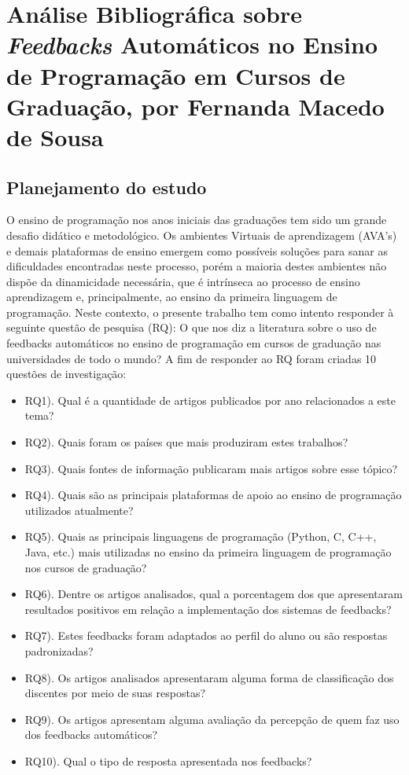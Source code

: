 \chapter{Análise Bibliográfica sobre \textit{Feedbacks} Automáticos no Ensino de Programação em Cursos de Graduação, por Fernanda Macedo de Sousa \label{chap:bibliometria:fernandams}}

\section{Planejamento do estudo}


O ensino de programação nos anos iniciais das graduações tem sido um grande desafio didático e metodológico. Os ambientes Virtuais de aprendizagem (AVA’s) e demais plataformas de ensino emergem como possíveis soluções para sanar as dificuldades encontradas neste processo, porém a maioria destes ambientes não dispõe da dinamicidade necessária, que é intrínseca ao processo de ensino aprendizagem e, principalmente, ao ensino da primeira linguagem de programação. Neste contexto, o presente trabalho tem como intento responder à seguinte questão de pesquisa (RQ): O que nos diz a literatura sobre o uso de feedbacks automáticos no ensino de programação em cursos de graduação nas universidades de todo o mundo? A fim de responder ao RQ foram criadas 10 questões de investigação:

\begin{itemize}
    \item RQ1). Qual é a quantidade de artigos publicados por ano relacionados a este tema? 
    \item RQ2). Quais foram os países que mais produziram estes trabalhos? 
    \item RQ3). Quais fontes de informação publicaram mais artigos sobre esse tópico?
    \item RQ4). Quais são as principais plataformas de apoio ao ensino de programação utilizados atualmente?
    \item RQ5). Quais as principais linguagens de programação (Python, C, C++, Java, etc.) mais utilizadas no ensino da primeira linguagem de programação nos cursos de graduação?
    \item RQ6). Dentre os artigos analisados, qual a porcentagem dos que apresentaram resultados positivos em relação a implementação dos sistemas de feedbacks?
    \item RQ7). Estes feedbacks foram adaptados ao perfil do aluno ou são respostas padronizadas?
    \item RQ8). Os artigos analisados apresentaram alguma forma de classificação dos discentes por meio de suas respostas?
    \item RQ9). Os artigos apresentam alguma avaliação da percepção de quem faz uso dos feedbacks automáticos?
    \item RQ10). Qual o tipo de resposta apresentada nos feedbacks?
\end{itemize}

